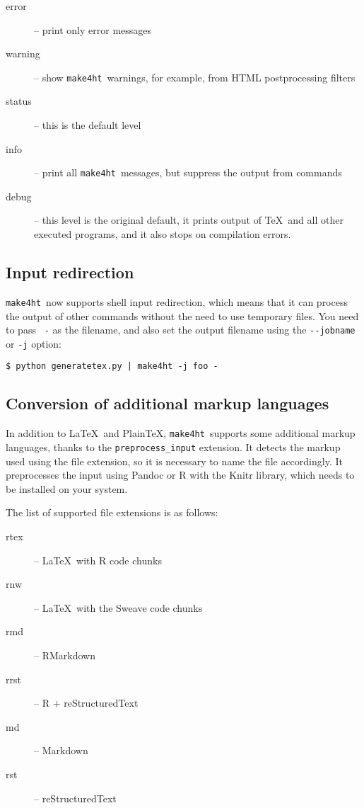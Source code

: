 \documentclass{ltugboat}
\newcommand\makefourht{\texttt{make4ht}}
\begin{document}
\begin{description}
  \item[error] -- print only error messages
  \item[warning] -- show \makefourht\ warnings, for example, from HTML postprocessing filters
  \item[status] -- this is the default level 
  \item[info]  -- print all \makefourht\ messages, but suppress the output from commands
  \item[debug] -- this level is the original default, it prints output of
    \TeX\ and all other executed programs, and it also stops on compilation
    errors.
\end{description}

\subsection{Input redirection}

\makefourht\ now supports shell input redirection, which means that it can 
process the output of other commands without the need to use temporary files.
You need to pass \verb | -| as the filename, and also set the output filename using
the \verb|--jobname| or \verb|-j| option:

\begin{verbatim}
$ python generatetex.py | make4ht -j foo -
\end{verbatim}



\subsection{Conversion of additional markup languages}

In addition to \LaTeX\ and Plain\TeX, \makefourht\ supports some additional
markup languages, thanks to the \verb|preprocess_input| extension. 
It detects the markup used using the file extension, so it is necessary
to name the file accordingly. It preprocesses the input using Pandoc or R with
the Knitr library, which needs to be installed on your system.

The list of supported file extensions is as follows:

\begin{description}
  \item[rtex] -- \LaTeX\ with R code chunks
  \item[rnw] -- \LaTeX\ with the Sweave code chunks
  \item[rmd] -- RMarkdown
  \item[rrst] -- R + reStructuredText
  \item[md] -- Markdown
  \item[rst] -- reStructuredText
\end{description}
\end{document}
